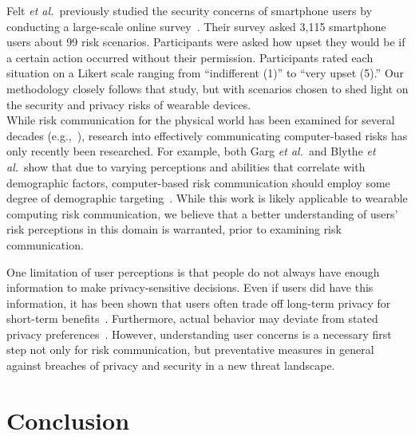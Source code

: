 \documentclass{sig-alternate-hotpets15}
\def\etal{{\it et al.~}}
\begin{document}
Felt \etal previously studied the security concerns of smartphone users by conducting a large-scale online survey~\cite{Felt}. Their survey asked 3,115 smartphone users about 99 risk scenarios. Participants were asked how upset they would be if a certain action occurred without their permission. Participants rated each situation on a Likert scale ranging from ``indifferent (1)'' to ``very upset (5).'' Our methodology closely follows that study, but with scenarios chosen to shed light on the security and privacy risks of wearable devices.\\

 While risk communication for the physical world has been examined for several decades (e.g.,~\cite{Fischhoff,Morgan2001}), research into effectively communicating computer-based risks has only recently been researched. For example, both Garg {\it et al.}\ and Blythe {\it et al.}\ show that due to varying perceptions and abilities that correlate with demographic factors, computer-based risk communication should employ some degree of demographic targeting~\cite{Garg2012,Blythe2011}. While this work is likely applicable to wearable computing risk communication, we believe that a better understanding of users' risk perceptions in this domain is warranted, prior to examining risk communication.

\cite{nasir2015consumers}

\cite{slovic2000perception}

\cite{denning2014situ}

\cite{hoyle2014privacy}

One limitation of user perceptions is that people do not always have enough information to make privacy-sensitive decisions. Even if users did have this information, it has been shown that users often trade off long-term privacy for short-term benefits~\cite{acquisti2005privacy}. Furthermore, actual behavior may deviate from stated privacy preferences~\cite{spiekermann2001privacy}. However, understanding user concerns is a necessary first step not only for risk communication, but preventative measures in general against breaches of privacy and security in a new threat landscape. 

\section{Conclusion}
\end{document}
